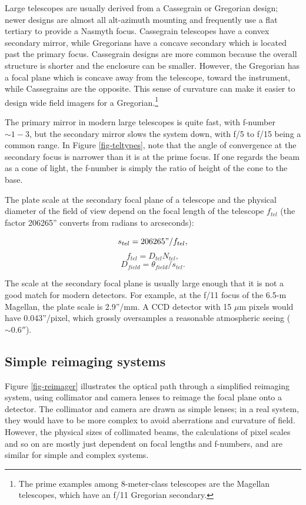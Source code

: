 \documentclass[12pt]{article}
\begin{document}
Large telescopes are usually derived from a Cassegrain or
Gregorian design; newer designs are almost all alt-azimuth 
mounting and frequently use a flat tertiary to provide a
Nasmyth focus.  Cassegrain telescopes have a convex secondary
mirror, while Gregorians have a concave secondary which is
located past the primary focus.  Cassegrain designs are more
common because the overall structure is shorter and the
enclosure can be smaller.  However, the Gregorian has a focal
plane which is concave away from the telescope, toward the
instrument, while Cassegrains are the opposite.  This sense
of curvature can make it easier to design wide field imagers
for a Gregorian.\footnote{The prime examples among 8-meter-class
telescopes are the Magellan telescopes, which have an f/11 Gregorian
secondary.}

The primary mirror in modern large telescopes is quite fast, with
f-number $\sim 1-3$, but the secondary mirror slows the system
down, with f/5 to f/15 being a common range.  In Figure
\ref{fig-teltypes}, note that the angle of convergence
at the secondary focus is narrower than it is at the prime
focus.  If one regards the beam as a cone of light, the f-number 
is simply the ratio of height of the cone to the base.

The plate scale at the secondary focal plane of a telescope and
the physical diameter of the field of view depend on the
focal length of the telescope $f_{tel}$
(the factor 206265'' converts from radians to arcseconds):
 
$$ s_{tel} = 206265" / f_{tel}, $$
$$ f_{tel} = D_{tel} N_{tel}, $$
$$ D_{field} = \theta_{field} / s_{tel}. $$

The scale at the secondary focal plane is usually large 
enough that it is not a good match for modern detectors.
For example, at the f/11 focus of the 6.5-m Magellan,
the plate scale is 2.9''/mm.  A CCD detector with 15 $\mu$m pixels
would have 0.043''/pixel, which grossly oversamples a
reasonable atmospheric seeing ($\sim 0.6''$).

\subsection{Simple reimaging systems}

Figure \ref{fig-reimager} illustrates the optical path
through a simplified reimaging system, using collimator 
and camera lenses to reimage the focal plane onto a detector.
The collimator and camera are drawn as simple lenses;
in a real system, they would have to be more complex
to avoid aberrations and curvature of field.  However,
the physical sizes of collimated beams,
the calculations of pixel scales and so on are mostly 
just dependent on focal lengths and f-numbers, and are
similar for simple and complex systems.
\end{document}
